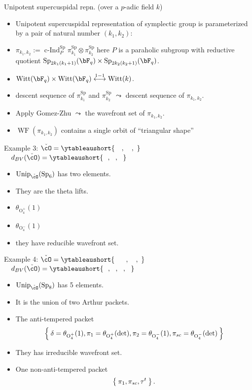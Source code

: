 \documentclass[t,mathserif,11pt]{beamer}
\theoremstyle{plain}
\theoremstyle{definition}
\newcommand{\rO}{\mathrm{O}}
\DeclareMathOperator{\WF}{WF}
\def\Sp{{\mathrm{Sp}}}
\def\Unip{{\mathrm{Unip}}}
\DeclareMathOperator{\cInd}{c-Ind}
\def\ckcO{{\check{\cO}}}
\def\blue{\color{blue}}
\let\oldemph\emph
\def\emph#1{\oldemph{\blue #1}}
\let\ytb=\ytableaushort
\def\dBV{d_{BV}}
\def\Witt{\mathrm{Witt}}
\begin{document}
  \begin{frame}{Unipotent supercuspidal repn. (over a $p$-adic field $k$)}
    \begin{itemize}[<+->]
      \item Unipotent supercuspidal representation of symplectic group is parameterized by a pair of natural number $(k_1,k_2)$: 
      \item \emph{$\pi_{k_1,k_2}:=\cInd_P^{\Sp} \pi^\Sp_{k_1}\otimes \pi^\Sp_{k_2}$} here $P$ is a paraholic subgroup with reductive quotient $\Sp_{2k_1(k_1+1)}(\bF_q)\times \Sp_{2k_2(k_2+1)}(\bF_q)$. 
      \item $\Witt(\bF_q)\times \Witt(\bF_q)\stackrel{1-1}{\longleftrightarrow} \Witt(k)$. %
      \item descent sequence of $\pi^\Sp_{k_1}$ and $\pi^\Sp_{k_2}$ $\leadsto$ descent sequence of $\pi_{k_1,k_2}$.  
      \item Apply Gomez-Zhu $\leadsto$ the wavefront set of $\pi_{k_1,k_2}$. 
      \item $\WF(\pi_{k_1,k_2})$ contains a single orbit of ``triangular shape''  
    \end{itemize}
  \end{frame}


  \begin{frame}{Example 3: $\ckcO = \ytb{\ \ \ , \ \ \ ,\ }$  $\quad \dBV(\ckcO) = \ytb{\ \ ,\ \ , \ \ }$}
   \begin{itemize}
    \item $\Unip_\ckcO(\Sp_6)$ has two elements.
    \item They are the theta lifts.
    \item[] $\theta_{\rO^+_4}(1)$ 
    \item[] $\theta_{\rO^-_4}(1)$
    \item they have reducible wavefront set. 
   \end{itemize} 
  \end{frame}

  \begin{frame}{Example 4: $\ckcO = \ytb{\ \ \ \ \ , \ \ \ ,\ }$  $\quad \dBV(\ckcO) = \ytb{\ \ ,\ \ , \ \ ,\ \ }$}
   \begin{itemize}
    \item $\Unip_\ckcO(\Sp_8)$ has 5 elements.
    \item It is the union of two Arthur packets. 
    \item The anti-tempered packet 
    \[
    \Set{\delta=\theta_{\rO^+_4}(1), \pi_1=\theta_{\rO^+_4}(\det),  \pi_2=\theta_{\rO^-_4}(1), \pi_{sc}=\theta_{\rO^-_4}(\det)}
    \]
    \item They has irreducible wavefront set. 
    \item One non-anti-tempered packet 
      \[
      \Set{\pi_1, \pi_{sc},\tau^t }. 
      \]
   \end{itemize} 
  \end{frame}

  \begin{frame}{}
       \vfill
        \vfill
      \end{frame}

  
\end{document}
